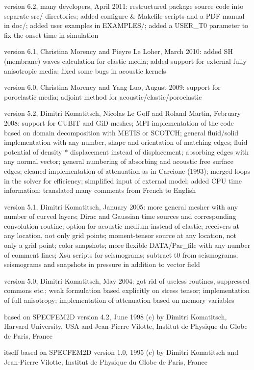 version 6.2, many developers, April 2011:\newline
restructured package source code into separate src/ directories;
added configure \& Makefile scripts and a PDF manual in doc/;
added user examples in EXAMPLES/;
added a USER\_T0 parameter to fix the onset time in simulation\newline

version 6.1, Christina Morency and Pieyre Le Loher, March 2010:\newline
added SH (membrane) waves calculation for elastic media;
added support for external fully anisotropic media;
fixed some bugs in acoustic kernels\newline

version 6.0, Christina Morency and Yang Luo, August 2009:\newline
support for poroelastic media;
adjoint method for acoustic/elastic/poroelastic\newline

version 5.2, Dimitri Komatitsch, Nicolas Le Goff and Roland Martin, February 2008:\newline
support for CUBIT and GiD meshes;
MPI implementation of the code based on domain decomposition with METIS or SCOTCH;
general fluid/solid implementation with any number, shape and orientation of matching edges;
fluid potential of density $*$ displacement instead of displacement;
absorbing edges with any normal vector;
general numbering of absorbing and acoustic free surface edges;
cleaned implementation of attenuation as in Carcione (1993);
merged loops in the solver for efficiency;
simplified input of external model;
added CPU time information;
translated many comments from French to English\newline

version 5.1, Dimitri Komatitsch, January 2005:\newline
more general mesher with any number of curved layers;
Dirac and Gaussian time sources and corresponding convolution routine;
option for acoustic medium instead of elastic;
receivers at any location, not only grid points;
moment-tensor source at any location, not only a grid point;
color snapshots;
more flexible DATA/Par\_file with any number of comment lines;
Xsu scripts for seismograms;
subtract t0 from seismograms;
seismograms and snapshots in pressure in addition to vector field\newline

version 5.0, Dimitri Komatitsch, May 2004:\newline
got rid of useless routines, suppressed commons etc.;
weak formulation based explicitly on stress tensor;
implementation of full anisotropy;
implementation of attenuation based on memory variables\newline

based on SPECFEM2D version 4.2, June 1998\newline
(c) by Dimitri Komatitsch, Harvard University, USA
and Jean-Pierre Vilotte, Institut de Physique du Globe de Paris, France

itself based on SPECFEM2D version 1.0, 1995\newline
(c) by Dimitri Komatitsch and Jean-Pierre Vilotte,
Institut de Physique du Globe de Paris, France


